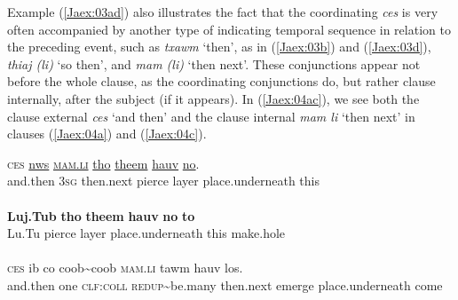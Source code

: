 \documentclass[output=paper]{LSP/langsci}
\begin{document}
Example (\ref{Jaex:03ad}) also illustrates the fact that the coordinating  \textit{ces} is very often accompanied by another type of  indicating temporal sequence in relation to the preceding event, such as \textit{txawm} `then', as in (\ref{Jaex:03b}) and (\ref{Jaex:03d}), \textit{thiaj (li) } `so then', and \textit{mam (li) } `then next'. These  conjunctions appear not before the whole clause, as the coordinating conjunctions do, but rather clause internally, after the subject (if it appears). In (\ref{Jaex:04ac}), we see both the clause external \textit{ces} `and then' and the clause internal \textit{mam li } `then next' in clauses (\ref{Jaex:04a}) and (\ref{Jaex:04c}). 

\begin{exe}
\ex \label{Jaex:04ac}
\begin{xlist}
\ex \label{Jaex:04a}
\gll \textsc{ces} \underline{nws} \underline{\textsc{mam.li}} \underline{tho} \underline{theem} \underline{hauv} \underline{no}.\\
and.then \textsc{3sg} then.next pierce layer place.underneath this\\
\glt {}\\
\ex \label{Jaex:04b}
\gll \textbf{Luj.Tub} \textbf{tho} \textbf{theem} \textbf{hauv} \textbf{no} \textbf{to}\\
Lu.Tu  pierce layer  place.underneath  this make.hole\\ 
\glt {}\\
\ex \label{Jaex:04c}
\gll \textsc{ces} ib co coob{\textasciitilde}coob \textsc{mam.li} tawm hauv los.\\     	      
     and.then one \textsc{clf:coll} \textsc{redup}{\textasciitilde}be.many then.next emerge place.underneath come\\
\glt {} \citep[][12]{johnson92}
\end{xlist}
\end{exe}
\end{document}
